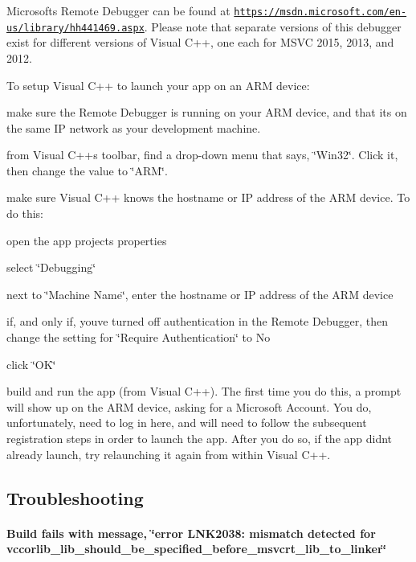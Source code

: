 Microsoft\textquotesingle{}s Remote Debugger can be found at \href{https://msdn.microsoft.com/en-us/library/hh441469.aspx}{\tt https\+://msdn.\+microsoft.\+com/en-\/us/library/hh441469.\+aspx}. Please note that separate versions of this debugger exist for different versions of Visual C++, one each for M\+S\+VC 2015, 2013, and 2012.

To setup Visual C++ to launch your app on an A\+RM device\+:


\begin{DoxyEnumerate}
\item make sure the Remote Debugger is running on your A\+RM device, and that it\textquotesingle{}s on the same IP network as your development machine.
\item from Visual C++\textquotesingle{}s toolbar, find a drop-\/down menu that says, \char`\"{}\+Win32\char`\"{}. Click it, then change the value to \char`\"{}\+A\+R\+M\char`\"{}.
\item make sure Visual C++ knows the hostname or IP address of the A\+RM device. To do this\+:
\begin{DoxyEnumerate}
\item open the app project\textquotesingle{}s properties
\item select \char`\"{}\+Debugging\char`\"{}
\item next to \char`\"{}\+Machine Name\char`\"{}, enter the hostname or IP address of the A\+RM device
\item if, and only if, you\textquotesingle{}ve turned off authentication in the Remote Debugger, then change the setting for \char`\"{}\+Require Authentication\char`\"{} to No
\item click \char`\"{}\+O\+K\char`\"{}
\end{DoxyEnumerate}
\item build and run the app (from Visual C++). The first time you do this, a prompt will show up on the A\+RM device, asking for a Microsoft Account. You do, unfortunately, need to log in here, and will need to follow the subsequent registration steps in order to launch the app. After you do so, if the app didn\textquotesingle{}t already launch, try relaunching it again from within Visual C++.
\end{DoxyEnumerate}

\subsection*{Troubleshooting }

\paragraph*{Build fails with message, \char`\"{}error L\+N\+K2038\+: mismatch detected for \textquotesingle{}vccorlib\+\_\+lib\+\_\+should\+\_\+be\+\_\+specified\+\_\+before\+\_\+msvcrt\+\_\+lib\+\_\+to\+\_\+linker\textquotesingle{}\char`\"{}}

